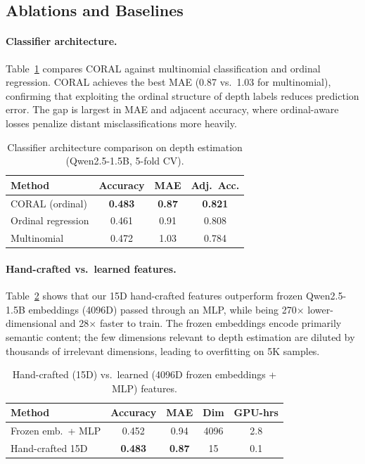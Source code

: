 \documentclass[11pt,a4paper]{article}
\begin{document}
\subsection{Ablations and Baselines}
\label{sec:ablations}

\paragraph{Classifier architecture.}
Table~\ref{tab:classifier} compares CORAL against multinomial classification and ordinal regression. CORAL achieves the best MAE (0.87 vs.\ 1.03 for multinomial), confirming that exploiting the ordinal structure of depth labels reduces prediction error. The gap is largest in MAE and adjacent accuracy, where ordinal-aware losses penalize distant misclassifications more heavily.

\begin{table}[t]
\centering
\small
\caption{Classifier architecture comparison on depth estimation (Qwen2.5-1.5B, 5-fold CV).}
\label{tab:classifier}
\begin{tabular}{@{}lccc@{}}
\toprule
\textbf{Method} & \textbf{Accuracy} & \textbf{MAE} & \textbf{Adj.\ Acc.} \\
\midrule
CORAL (ordinal) & \textbf{0.483} & \textbf{0.87} & \textbf{0.821} \\
Ordinal regression & 0.461 & 0.91 & 0.808 \\
Multinomial & 0.472 & 1.03 & 0.784 \\
\bottomrule
\end{tabular}
\end{table}

\paragraph{Hand-crafted vs.\ learned features.}
Table~\ref{tab:features} shows that our 15D hand-crafted features outperform frozen Qwen2.5-1.5B embeddings (4096D) passed through an MLP, while being 270$\times$ lower-dimensional and 28$\times$ faster to train. The frozen embeddings encode primarily semantic content; the few dimensions relevant to depth estimation are diluted by thousands of irrelevant dimensions, leading to overfitting on 5K samples.

\begin{table}[t]
\centering
\small
\caption{Hand-crafted (15D) vs.\ learned (4096D frozen embeddings + MLP) features.}
\label{tab:features}
\begin{tabular}{@{}lcccc@{}}
\toprule
\textbf{Method} & \textbf{Accuracy} & \textbf{MAE} & \textbf{Dim} & \textbf{GPU-hrs} \\
\midrule
Frozen emb.\ + MLP & 0.452 & 0.94 & 4096 & 2.8 \\
Hand-crafted 15D & \textbf{0.483} & \textbf{0.87} & 15 & 0.1 \\
\bottomrule
\end{tabular}
\end{table}
\end{document}
